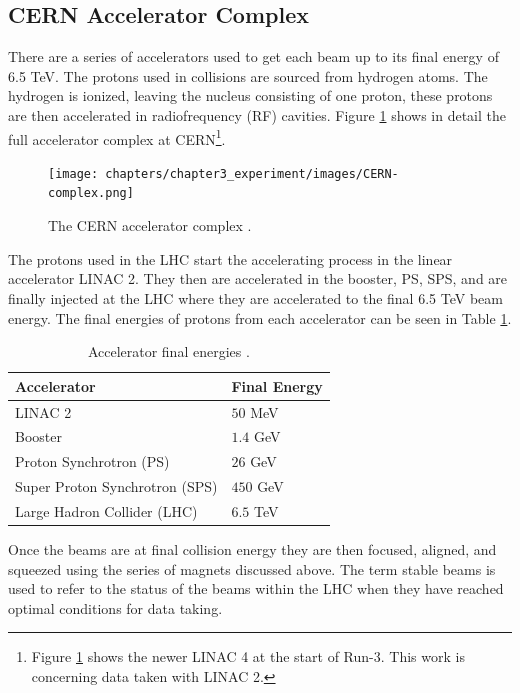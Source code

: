 	\subsection{CERN Accelerator Complex}\label{ssec:cern-accelerators}
		There are a series of accelerators used to get each beam up to its final energy of 6.5 TeV. The protons used in collisions are sourced from hydrogen atoms. The hydrogen is ionized, leaving the nucleus consisting of one proton, these protons are then accelerated in radiofrequency (RF) cavities. Figure \ref{fig:CERN-complex} shows in detail the full accelerator complex at CERN\footnote{Figure \ref{fig:CERN-complex} shows the newer LINAC 4 at the start of Run-3. This work is concerning data taken with LINAC 2.}.
		\begin{figure}[!ht]
		\centering
		\texttt{[image: chapters/chapter3\_experiment/images/CERN-complex.png]}
		\caption{The CERN accelerator complex \cite{CERN-complex}.}
		\label{fig:CERN-complex}
		\end{figure}
		The protons used in the \gls{LHC} start the accelerating process in the linear accelerator LINAC 2. They then are accelerated in the booster, PS, SPS, and are finally injected at the \gls{LHC} where they are accelerated to the final 6.5 TeV beam energy. The final energies of protons from each accelerator can be seen in Table \ref{tab:accelerator-complex}.
		\begin{table}[!thp]
			\centering
			\caption{Accelerator final energies \cite{lhc-machine}.}
			\begin{tabular}{| l | l |}  
			\hline
			Accelerator 					& Final Energy 	\\ \hline
			\hline
			LINAC 2 						& $50$ MeV 		\\ 	\hline
			Booster 						& $1.4$ GeV 	\\ 	\hline
			Proton Synchrotron (PS)			& $26$ GeV 		\\ 	\hline
			Super Proton Synchrotron (SPS) 	& $450$ GeV 	\\ 	\hline
			Large Hadron Collider (LHC)		& $6.5$ TeV 	\\ 	\hline
			\end{tabular}
			\label{tab:accelerator-complex}
		\end{table}
		Once the beams are at final collision energy they are then focused, aligned, and squeezed using the series of magnets discussed above. The term stable beams is used to refer to the status of the beams within the LHC when they have reached optimal conditions for data taking.

